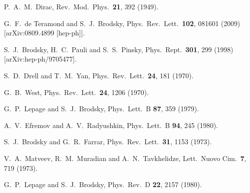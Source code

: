 \documentclass[prd,aps,onecolumn,nofootinbib]{revtex4}
\begin{document}
\begin{thebibliography}{99}


  P.~A.~M.~Dirac,
Rev.\ Mod.\ Phys.\  {\bf 21}, 392 (1949).


  G.~F.~de Teramond and S.~J.~Brodsky,
  Phys.\ Rev.\ Lett.\  {\bf 102}, 081601 (2009)
  [arXiv:0809.4899 [hep-ph]].

  S.~J.~Brodsky, H.~C.~Pauli and S.~S.~Pinsky,
  Phys.\ Rept.\  {\bf 301}, 299 (1998)
  [arXiv:hep-ph/9705477].

  S.~D.~Drell and T.~M.~Yan,
  Phys.\ Rev.\ Lett.\  {\bf 24}, 181 (1970).

  G.~B.~West,
  Phys.\ Rev.\ Lett.\  {\bf 24}, 1206 (1970).

  G.~P.~Lepage and S.~J.~Brodsky,
  Phys.\ Lett.\  B {\bf 87}, 359 (1979).

  A.~V.~Efremov and A.~V.~Radyushkin,
  Phys.\ Lett.\  B {\bf 94}, 245 (1980).
  
  S.~J.~Brodsky and G.~R.~Farrar,
  Phys.\ Rev.\ Lett.\  {\bf 31}, 1153 (1973).
  
  V.~A.~Matveev, R.~M.~Muradian and A.~N.~Tavkhelidze,
  Lett.\ Nuovo Cim.\  {\bf 7}, 719 (1973).

  G.~P.~Lepage and S.~J.~Brodsky,
  Phys.\ Rev.\  D {\bf 22}, 2157 (1980).


\end{thebibliography}
\end{document}
